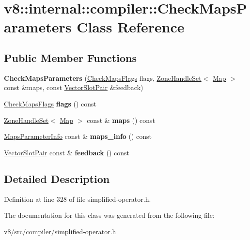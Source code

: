 \hypertarget{classv8_1_1internal_1_1compiler_1_1CheckMapsParameters}{}\section{v8\+:\+:internal\+:\+:compiler\+:\+:Check\+Maps\+Parameters Class Reference}
\label{classv8_1_1internal_1_1compiler_1_1CheckMapsParameters}
\subsection*{Public Member Functions}
\begin{DoxyCompactItemize}
\item 
\mbox{\label{classv8_1_1internal_1_1compiler_1_1CheckMapsParameters_ad8c73c71e9e7c677a714170fe54e00a8}} 
{\bfseries Check\+Maps\+Parameters} (\mbox{\hyperlink{classv8_1_1base_1_1Flags}{Check\+Maps\+Flags}} flags, \mbox{\hyperlink{classv8_1_1internal_1_1ZoneHandleSet}{Zone\+Handle\+Set}}$<$ \mbox{\hyperlink{classv8_1_1internal_1_1Map}{Map}} $>$ const \&maps, const \mbox{\hyperlink{classv8_1_1internal_1_1VectorSlotPair}{Vector\+Slot\+Pair}} \&feedback)
\item 
\mbox{\label{classv8_1_1internal_1_1compiler_1_1CheckMapsParameters_a5a4770eb3b43abdc6739a1a3809aa146}} 
\mbox{\hyperlink{classv8_1_1base_1_1Flags}{Check\+Maps\+Flags}} {\bfseries flags} () const
\item 
\mbox{\label{classv8_1_1internal_1_1compiler_1_1CheckMapsParameters_adc35b1428d4a878f3fe41974884be714}} 
\mbox{\hyperlink{classv8_1_1internal_1_1ZoneHandleSet}{Zone\+Handle\+Set}}$<$ \mbox{\hyperlink{classv8_1_1internal_1_1Map}{Map}} $>$ const  \& {\bfseries maps} () const
\item 
\mbox{\label{classv8_1_1internal_1_1compiler_1_1CheckMapsParameters_a0c14e92e20a27f284a5686e6bba3c8ec}} 
\mbox{\hyperlink{classv8_1_1internal_1_1compiler_1_1MapsParameterInfo}{Maps\+Parameter\+Info}} const  \& {\bfseries maps\+\_\+info} () const
\item 
\mbox{\label{classv8_1_1internal_1_1compiler_1_1CheckMapsParameters_af9cd47439099f95fe0bb1a7334f279b1}} 
\mbox{\hyperlink{classv8_1_1internal_1_1VectorSlotPair}{Vector\+Slot\+Pair}} const  \& {\bfseries feedback} () const
\end{DoxyCompactItemize}


\subsection{Detailed Description}


Definition at line 328 of file simplified-\/operator.\+h.



The documentation for this class was generated from the following file\+:\begin{DoxyCompactItemize}
\item 
v8/src/compiler/simplified-\/operator.\+h\end{DoxyCompactItemize}
